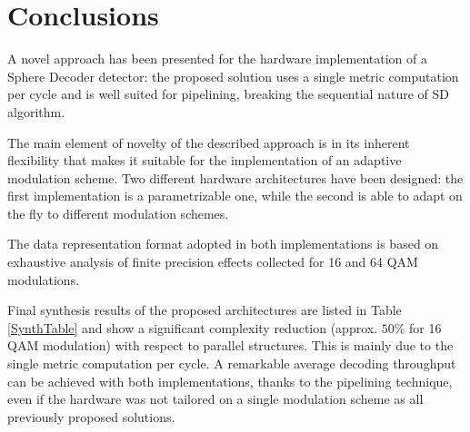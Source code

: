 \documentclass[12pt,onecolumn,draftclsnofoot]{IEEEtran}
\begin{document}
\section{Conclusions}
A novel approach has been presented for the hardware implementation 
of a Sphere Decoder detector: the proposed solution uses a single metric computation per cycle and
is well suited for pipelining, breaking the sequential nature of SD
algorithm.

The main element of novelty of the described approach is in its 
inherent flexibility that makes it suitable for the implementation of
an adaptive modulation scheme.
Two different hardware architectures have been designed: the first 
implementation is a parametrizable one,
while the second is able to adapt on the fly to different modulation
schemes.

The data representation format adopted in both implementations is
based on exhaustive analysis of finite precision effects
collected for 16 and 64 QAM modulations.

Final synthesis results of the proposed architectures are listed in
Table \ref{SynthTable} and show a significant complexity reduction
(approx. $50\%$ for 16 QAM modulation) with respect to parallel
structures. This is mainly due to the single metric computation per
cycle. A remarkable average decoding throughput can be achieved with
both implementations, thanks to the pipelining technique, even if
the hardware was not tailored on a single modulation scheme as all
previously proposed solutions.


\end{document}
